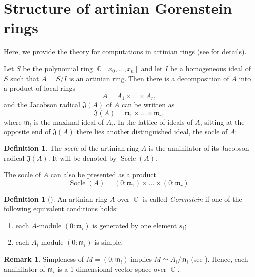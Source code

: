 \documentclass[a4paper,11pt,english,german]{amsart}
\DeclareMathOperator{\C}{\mathbb{C}}
\DeclareMathOperator{\Socle}{Socle}
\theoremstyle{definition}
\newtheorem{Def}[thm]{Definition}
\newtheorem{remark}[thm]{Remark}
\begin{document}
\section{Structure of artinian Gorenstein rings}\label{3}

Here, we provide the theory for computations in artinian rings (see \cite[Chapter 4]{vasconcelos2004computational} for details).

Let $S$ be the polynomial ring $\C[x_0,\dots,x_n]$ and let $I$ be a homogeneous ideal of $S$ such that $A=S/I$ is an artinian ring. Then there is a decomposition of $A$ into a product of local rings
\begin{equation*}
	A=A_1 \times \dots \times A_r,
\end{equation*}
and the Jacobson radical $\mathfrak{J}(A)$ of $A$ can be written as
\begin{equation*}
	\mathfrak{J}(A)=\mathfrak{m}_1\times \dots \times \mathfrak{m}_r,
\end{equation*}
where $\mathfrak{m}_i$ is the maximal ideal of $A_i$. In the lattice of ideals of $A$, sitting at the opposite end of $\mathfrak{J}(A)$ there lies another distinguished ideal, the socle of $A$:

\begin{Def}
The \emph{socle} of the artinian ring $A$ is the annihilator of its Jacobson radical $\mathfrak{J}(A)$. It will be denoted by $\Socle(A)$.	
\end{Def}

The socle of $A$ can also be presented as a product
\begin{equation*}
	\Socle(A)=(0:\mathfrak{m}_1)\times \dots \times (0:\mathfrak{m}_r).
\end{equation*} 
\begin{Def}[{\cite[Proposition 21.5]{eisenbud2013commutative}}]
An artinian ring $A$ over $\C$ is called \emph{Gorenstein} if one of the following equivalent conditions holds:
\begin{enumerate}
\item	each $A$-module $(0:\mathfrak{m}_i)$ is generated by one element $s_i$;
\item each $A_i$-module $(0:\mathfrak{m}_i)$ is simple.
\end{enumerate}
\end{Def}

\begin{remark}\label{1-dimensional}
 Simpleness of $M=(0:\mathfrak{m}_i)$ implies $M\simeq A_i/\mathfrak{m}_i$ (see \cite[Theorem 2.13]{eisenbud2013commutative}). Hence, each annihilator of $\mathfrak{m}_i$ is a 1-dimensional vector space over $\C$.	
\end{remark}
\end{document}
